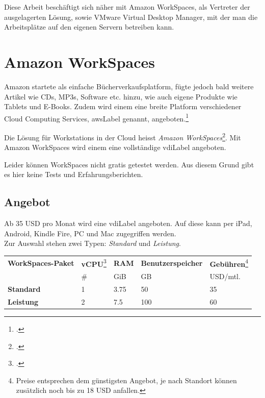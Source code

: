Diese Arbeit beschäftigt sich näher mit Amazon WorkSpaces, als Vertreter der ausgelagerten Lösung, sowie VMware Virtual Desktop Manager, mit der man die Arbeitsplätze auf den eigenen Servern betreiben kann.

\section{Amazon WorkSpaces}

Amazon startete als einfache Bücherverkaufsplatform, fügte jedoch bald weitere Artikel wie CDs, MP3s, Software etc. hinzu, wie auch eigene Produkte wie Tablets und E-Books.
Zudem wird einem eine breite Platform verschiedener Cloud Computing Services, \Gls{awsLabel} genannt, angeboten.\footcite{Amazon.com_-_Wikipedia_the_free_encyclopedia_2014-11-15}

Die Lösung für Workstations in der Cloud heisst \textit{Amazon WorkSpaces}\footcite{AWS_Amazon_WorkSpaces_2014-11-03}.
Mit Amazon WorkSpaces wird einem eine vollständige \Gls{vdiLabel} angeboten.

Leider können WorkSpaces nicht gratis getestet werden. Aus diesem Grund gibt es hier keine Tests und Erfahrungsberichten.

\subsection{Angebot}
Ab 35 USD pro Monat wird eine \Gls{vdiLabel} angeboten. Auf diese kann per iPad, Android, Kindle Fire, PC und Mac zugegriffen werden.\\
Zur Auswahl stehen zwei Typen: \textit{Standard} und \textit{Leistung}.

\begin{table}[H]
	\centering
	\small\renewcommand{\arraystretch}{1.4}  
	\begin{tabularx}{0.9\textwidth}{X | Y | Y | Y | Y }
		\hline
		\textbf{WorkSpaces-Paket} & \textbf{vCPU}\footcite{Virtual_CPUs_with_Amazon_Web_Services_2014-11-15} & \textbf{RAM} & \textbf{Benutzerspeicher} & \textbf{Gebühren}\footnote{Preise entsprechen dem günstigsten Angebot, je nach Standort können zusätzlich noch bis zu 18 USD anfallen.}\\
		 & \# & GiB & GB & USD/mtl.\\
		\hline
			\textbf{Standard} & 1 & 3.75 & 50 & 35\\
			\textbf{Leistung} & 2 & 7.5 & 100 & 60\\
		\hline
	\end{tabularx}
\end{table}

